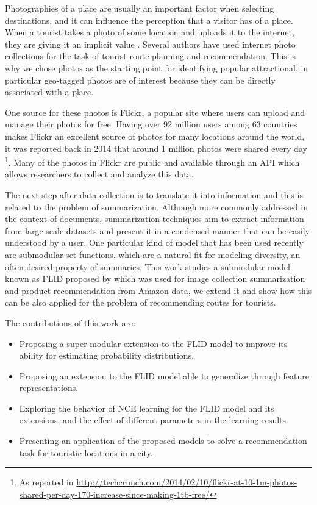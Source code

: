 Photographies of a place are usually an important factor when selecting destinations, and it can influence the perception that a visitor has of a place. When a tourist takes a photo of some location and uploads it to the internet, they are giving it an implicit value  \citep{Donaire2014}. Several authors have used internet photo collections for the task of tourist route planning and recommendation. This is why we chose photos as the starting point for identifying popular attractional, in particular geo-tagged photos are of interest because they can be directly associated with a place.

One source for these photos is Flickr, a popular site where users can upload and manage their photos for free. Having over 92 million users among 63 countries makes Flickr an excellent source of photos for many locations around the world, it was reported back in 2014 that around 1 million photos were shared every day \footnote{As reported in \url{http://techcrunch.com/2014/02/10/flickr-at-10-1m-photos-shared-per-day-170-increase-since-making-1tb-free/}}. Many of the photos in Flickr are public and available through an API which allows researchers to collect and analyze this data.

The next step after data collection is to translate it into information and this is related to the problem of summarization. Although more commonly addressed in the context of documents, summarization techniques aim to extract information from large scale datasets and present it in a condensed manner that can be easily understood by a user. One particular kind of model that has been used recently are submodular set functions, which are a natural fit for modeling diversity, an often desired property of summaries. This work studies a submodular model known as FLID proposed by \citet{tschiatschek16learning} which was used for image collection summarization and product recommendation from Amazon data, we extend it and show how this can be also applied for the problem of recommending routes for tourists.

The contributions of this work are:

\begin{itemize}
  \item Proposing a super-modular extension to the FLID model to improve its ability for estimating probability distributions.
  \item Proposing an extension to the FLID model able to generalize through feature representations.
  \item Exploring the behavior of NCE learning for the FLID model and its extensions, and the effect of different parameters in the learning results.
  \item Presenting an application of the proposed models to solve a recommendation task for touristic locations in a city.
\end{itemize}

